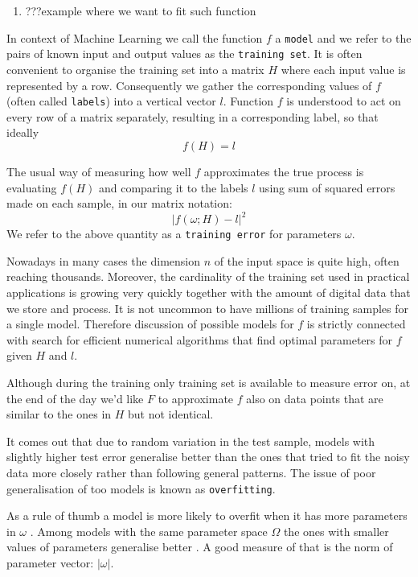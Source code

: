 \documentclass[a4paper]{article}
\theoremstyle{break}
\newcommand{\bib}{???}
\begin{document}
\begin{enumerate}
    \item \bib example where we want to fit such function
\end{enumerate}

In context of Machine Learning we call the function $f$ a {\tt model} and we refer to the pairs of known input and output values as the {\tt training set}. It is often convenient to organise the training set into a matrix $H$ where each input value is represented by a row. Consequently we gather the corresponding values of $f$ (often called {\tt labels}) into a vertical vector $l$. Function $f$ is understood to act on every row of a matrix separately, resulting in a corresponding label, so that ideally
    $$ f(H) = l $$

The usual way of measuring how well $f$ approximates the true process is evaluating $f(H)$ and comparing it to the labels $l$ using sum of squared errors made on each sample, in our matrix notation:
$$ | f(\omega; H) - l |^2 $$
We refer to the above quantity as a {\tt training error} for parameters $\omega$.

Nowadays in many cases the dimension $n$ of the input space is quite high, often reaching thousands. Moreover, the cardinality of the training set used in practical applications is growing very quickly together with the amount of digital data that we store and process. It is not uncommon to have millions of training samples for a single model. Therefore discussion of possible models for $f$ is strictly connected with search for efficient numerical algorithms that find optimal parameters for $f$ given $H$ and $l$.

Although during the training only training set is available to measure error on, at the end of the day we'd like $F$ to approximate $f$ also on data points that are similar to the ones in $H$ but not identical.

It comes out that due to random variation in the test sample,  models with slightly higher test error generalise better than the ones that tried to fit the noisy data more closely rather than following general patterns.
The issue of poor generalisation of too  models is known as {\tt overfitting}.

As a rule of thumb a model is more likely to overfit when it has more parameters in $ \omega $ \cite[pp112-113]{goodfellow}. Among models with the same parameter space $ \Omega $ the ones with smaller values of parameters generalise better \cite[p119]{goodfellow}. A good measure of that is the norm of parameter vector: $ | \omega | $.
\end{document}
